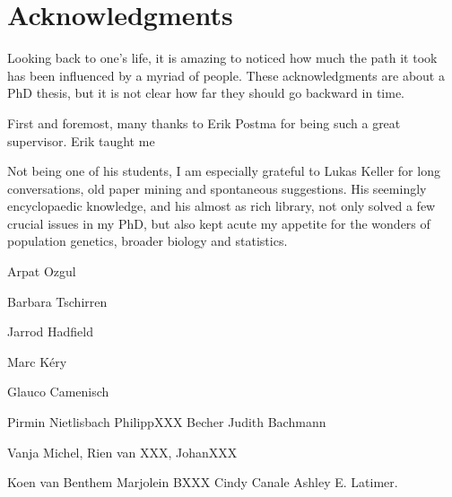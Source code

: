 \chapter{Acknowledgments}

Looking back to one's life, it is amazing to noticed how much the path it took has been influenced by a myriad of people. These acknowledgments are about a PhD thesis, but it is not clear how far they should go backward in time.

First and foremost, many thanks to Erik Postma for being such a great supervisor. 
Erik taught me 

Not being one of his students, I am especially grateful to Lukas Keller for long conversations, old paper mining and spontaneous suggestions. His seemingly encyclopaedic knowledge, and his almost as rich library, not only solved a few crucial issues in my PhD, but also kept acute my appetite for the wonders of population genetics, broader biology and statistics. 

Arpat Ozgul

Barbara Tschirren

Jarrod Hadfield

Marc K\'{e}ry


Glauco Camenisch

Pirmin Nietlisbach
PhilippXXX Becher
Judith Bachmann

Vanja Michel, Rien van XXX, JohanXXX

Koen van Benthem
Marjolein BXXX
Cindy Canale
Ashley E. Latimer.

